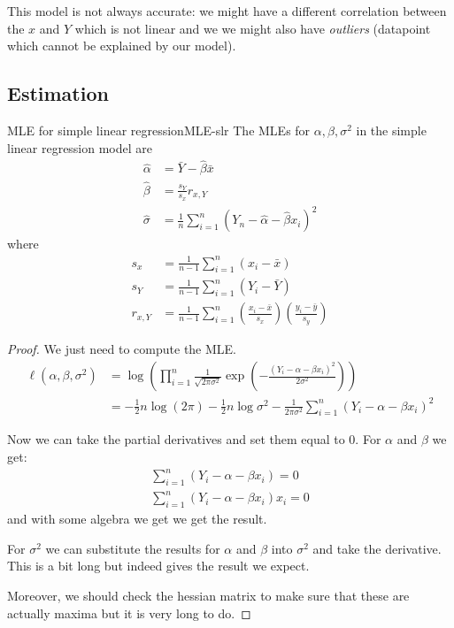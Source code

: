 \documentclass[12pt]{extarticle}
\begin{document}
This model is not always accurate: we might have a different correlation between the $x$ and $Y$ which is not linear
and we we might also have \emph{outliers} (datapoint which cannot be explained by our model).

\subsection{Estimation}

\begin{theorem}{MLE for simple linear regression}{MLE-slr}
    The MLEs for $\alpha, \beta, \sigma^2$ in the simple linear regression model are
    \begin{align}
        \hat \alpha & = \bar Y - \hat \beta \bar x                                       \\
        \hat \beta  & = \frac{s_Y}{s_x} r_{x, Y}                                         \\
        \hat \sigma & = \frac{1}{n} \sum_{i = 1}^n (Y_n - \hat \alpha- \hat \beta x_i)^2
    \end{align}
    where
    \begin{align}
        s_x      & = \frac{1}{n - 1} \sum^n_{i = 1}(x_i - \bar x)                                                              \\
        s_Y      & = \frac{1}{n - 1} \sum^n_{i = 1}(Y_i - \bar Y)                                                              \\
        r_{x, Y} & = \frac{1}{n - 1} \sum^n_{i = 1}\left(\frac{x_i - \bar x}{s_x}\right) \left(\frac{y_i - \bar y}{s_y}\right)
    \end{align}
\end{theorem}

\begin{proof}
    We just need to compute the MLE.
    \begin{align}
        \ell(\alpha, \beta, \sigma^2) & = \log\left( \prod_{i = 1}^n \frac{1}{\sqrt{2 \pi \sigma ^2}} \exp \left( - \frac{(Y_i - \alpha - \beta x_i)^2}{2 \sigma^2} \right) \right) \\
                                      & = -\frac{1}{2} n \log(2 \pi) - \frac{1}{2} n \log \sigma^2 - \frac{1}{2 \pi \sigma ^2} \sum_{i = 1}^n  (Y_i - \alpha - \beta x_i)^2
    \end{align}

    Now we can take the partial derivatives and set them equal to 0.
    For $\alpha$ and $\beta$ we get:
    \begin{gather}
        \sum_{i = 1}^n  (Y_i - \alpha - \beta x_i) = 0 \\
        \sum_{i = 1}^n  (Y_i - \alpha - \beta x_i) x_i = 0
    \end{gather}
    and with some algebra we get we get the result.

    For $\sigma^2$ we can substitute the results for $\alpha$ and $\beta$ into $\sigma^2$
    and take the derivative.
    This is a bit long but indeed gives the result we expect.

    Moreover, we should check the hessian matrix to make sure that these are actually maxima but it is very long to do.
\end{proof}
\end{document}
